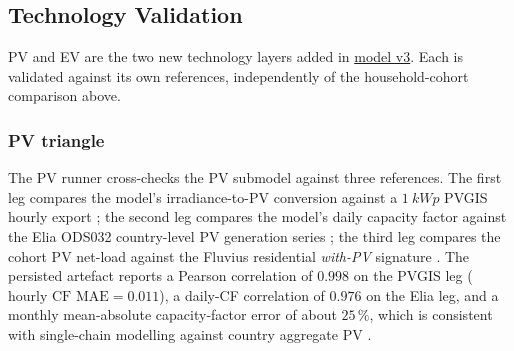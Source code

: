

\subsection{Technology Validation}
\label{sec:technologyValidation}

PV and EV are the two new technology layers added in \hyperref[sec:modelv3]{model v3}. Each is validated against its own references, independently of the household-cohort comparison above.

\subsubsection*{PV triangle}
The PV runner cross-checks the PV submodel against three references. The first leg compares the model's irradiance-to-PV conversion against a $\SI{1}{kWp}$ PVGIS hourly export \cite{Huld2012PVGIS}; the second leg compares the model's daily capacity factor against the Elia ODS032 country-level PV generation series \cite{Elia2024PVODS032}; the third leg compares the cohort PV net-load against the Fluvius residential \emph{with-PV} signature \cite{Fluvius2024OpenData}. The persisted artefact reports a Pearson correlation of $0.998$ on the PVGIS leg ($\text{hourly CF MAE} = 0.011$), a daily-CF correlation of $0.976$ on the Elia leg, and a monthly mean-absolute capacity-factor error of about $25\,\%$, which is consistent with single-chain modelling against country aggregate PV \cite{Pfeifroth2018SARAH}.




